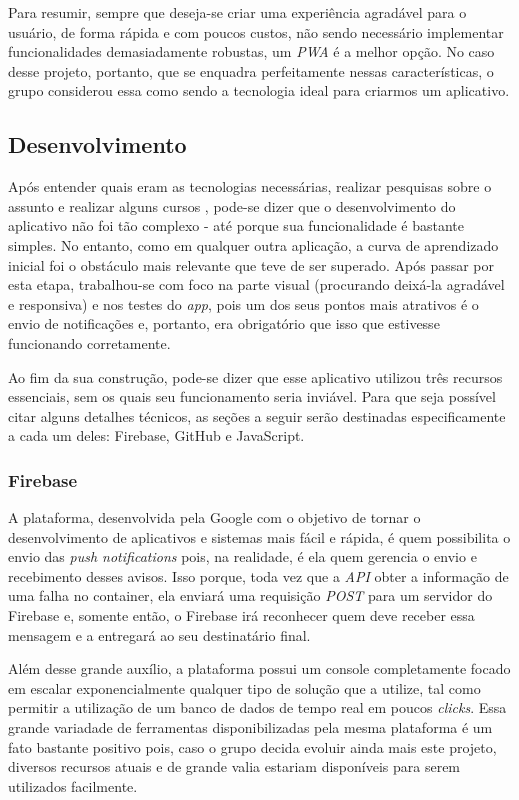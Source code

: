 Para resumir, sempre que deseja-se criar uma experiência agradável para o usuário, de forma rápida e com poucos custos, não sendo necessário implementar funcionalidades demasiadamente robustas, um \textit{PWA} é a melhor opção. No caso desse projeto, portanto, que se enquadra perfeitamente nessas características, o grupo considerou essa como sendo a tecnologia ideal para criarmos um aplicativo.


\subsection{Desenvolvimento}
\label{subsec:desenvolvimento}

Após entender quais eram as tecnologias necessárias, realizar pesquisas sobre o assunto e realizar alguns cursos \online{}, pode-se dizer que o desenvolvimento do aplicativo não foi tão complexo - até porque sua funcionalidade é bastante simples. No entanto, como em qualquer outra aplicação, a curva de aprendizado inicial foi o obstáculo mais relevante que teve de ser superado. Após passar por esta etapa, trabalhou-se com foco na parte visual (procurando deixá-la agradável e responsiva) e nos testes do \textit{app}, pois um dos seus pontos mais atrativos é o envio de notificações e, portanto, era obrigatório que isso que estivesse funcionando corretamente. 

Ao fim da sua construção, pode-se dizer que esse aplicativo utilizou três recursos essenciais, sem os quais seu funcionamento seria inviável. Para que seja possível citar alguns detalhes técnicos, as seções a seguir serão destinadas especificamente a cada um deles: Firebase, GitHub e JavaScript.

\subsubsection{Firebase}
\label{subsubsec:firebase}

A plataforma, desenvolvida pela Google com o objetivo de tornar o desenvolvimento de aplicativos e sistemas mais fácil e rápida, é quem possibilita o envio das \textit{push notifications} pois, na realidade, é ela quem gerencia o envio e recebimento desses avisos. Isso porque, toda vez que a \textit{API} obter a informação de uma falha no container, ela enviará uma requisição \textit{POST} para um servidor do Firebase e, somente então, o Firebase irá reconhecer quem deve receber essa mensagem e a entregará ao seu destinatário final.

Além desse grande auxílio, a plataforma possui um console completamente focado em escalar exponencialmente qualquer tipo de solução que a utilize, tal como permitir a utilização de um banco de dados de tempo real em poucos \textit{clicks}. Essa grande variadade de ferramentas disponibilizadas pela mesma plataforma é um fato bastante positivo pois, caso o grupo decida evoluir ainda mais este projeto, diversos recursos atuais e de grande valia estariam disponíveis para serem utilizados facilmente.


